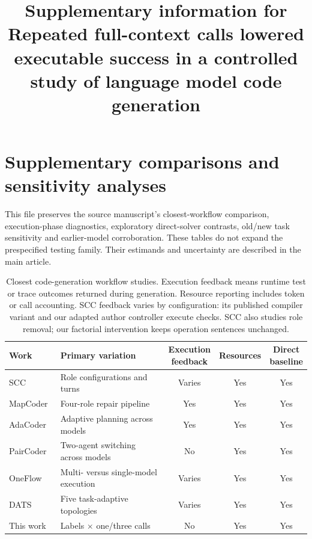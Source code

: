 \documentclass[pdflatex,sn-nature]{scientificreports}
\begin{document}
\title{Supplementary information for Repeated full-context calls lowered executable success in a controlled study of language model code generation}
\author*[1]{}
\maketitle
\section*{Supplementary comparisons and sensitivity analyses}
This file preserves the source manuscript's closest-workflow comparison, execution-phase diagnostics, exploratory direct-solver contrasts, old/new task sensitivity and earlier-model corroboration. These tables do not expand the prespecified testing family. Their estimands and uncertainty are described in the main article.

\begin{table}[!ht]
\caption{Closest code-generation workflow studies. Execution feedback means runtime test or trace outcomes returned during generation. Resource reporting includes token or call accounting. SCC feedback varies by configuration: its published compiler variant and our adapted author controller execute checks. SCC also studies role removal; our factorial intervention keeps operation sentences unchanged.}
\label{tab:related-designs}
\centering\scriptsize
\begin{tabularx}{\linewidth}{@{}lXccc@{}}
\toprule
Work & Primary variation & \shortstack{Execution\\feedback} & Resources & \shortstack{Direct\\baseline}\\
\midrule
SCC~\cite{dong2023selfcollaboration} & Role configurations and turns & Varies & Yes & Yes\\
MapCoder~\cite{islam2024mapcoder} & Four-role repair pipeline & Yes & Yes & Yes\\
AdaCoder~\cite{zhu2026adacoder} & Adaptive planning across models & Yes & Yes & Yes\\
PairCoder~\cite{chen2026paircoder} & Two-agent switching across models & No & Yes & Yes\\
OneFlow~\cite{xu2026oneflow} & Multi- versus single-model execution & Varies & Yes & Yes\\
DATS~\cite{hong2026dats} & Five task-adaptive topologies & Varies & Yes & Yes\\
This work & Labels $\times$ one/three calls & No & Yes & Yes\\
\bottomrule
\end{tabularx}
\end{table}
\end{document}

